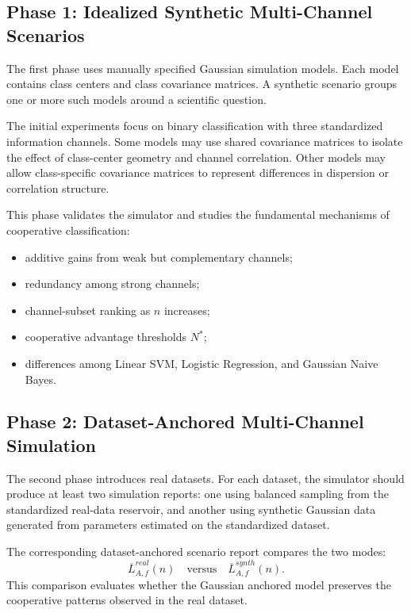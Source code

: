 \documentclass[11pt,a4paper]{article}
\begin{document}
\subsection{Phase 1: Idealized Synthetic Multi-Channel Scenarios}

The first phase uses manually specified Gaussian simulation models. Each model contains class centers and class covariance matrices. A synthetic scenario groups one or more such models around a scientific question.

The initial experiments focus on binary classification with three standardized information channels. Some models may use shared covariance matrices to isolate the effect of class-center geometry and channel correlation. Other models may allow class-specific covariance matrices to represent differences in dispersion or correlation structure.

This phase validates the simulator and studies the fundamental mechanisms of cooperative classification:
\begin{itemize}
    \item additive gains from weak but complementary channels;
    \item redundancy among strong channels;
    \item channel-subset ranking as $n$ increases;
    \item cooperative advantage thresholds $N^*$;
    \item differences among Linear SVM, Logistic Regression, and Gaussian Naive Bayes.
\end{itemize}

\subsection{Phase 2: Dataset-Anchored Multi-Channel Simulation}

The second phase introduces real datasets. For each dataset, the simulator should produce at least two simulation reports: one using balanced sampling from the standardized real-data reservoir, and another using synthetic Gaussian data generated from parameters estimated on the standardized dataset.

The corresponding dataset-anchored scenario report compares the two modes:
\[
    \overline{L}^{real}_{A,f}(n)
    \quad \text{versus} \quad
    \overline{L}^{synth}_{A,f}(n).
\]
This comparison evaluates whether the Gaussian anchored model preserves the cooperative patterns observed in the real dataset.
\end{document}
